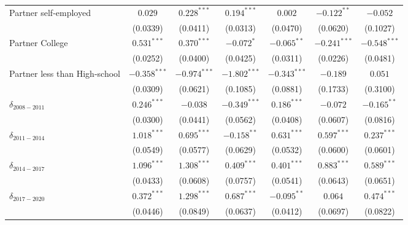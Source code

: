 \begin{tabular}{l|ccc|ccc}
Partner self-employed         &         $0.029$ &   $0.228^{***}$ &   $0.194^{***}$ &                $0.002$ &   $-0.122^{**}$ &        $-0.052$ \\
                              &        (0.0339) &        (0.0411) &        (0.0313) &               (0.0470) &        (0.0620) &        (0.1027) \\
Partner College               &   $0.531^{***}$ &   $0.370^{***}$ &      $-0.072^*$ &          $-0.065^{**}$ &  $-0.241^{***}$ &  $-0.548^{***}$ \\
                              &        (0.0252) &        (0.0400) &        (0.0425) &               (0.0311) &        (0.0226) &        (0.0481) \\
Partner less than High-school &  $-0.358^{***}$ &  $-0.974^{***}$ &  $-1.802^{***}$ &         $-0.343^{***}$ &        $-0.189$ &         $0.051$ \\
                              &        (0.0309) &        (0.0621) &        (0.1085) &               (0.0881) &        (0.1733) &        (0.3100) \\
$\delta_{2008-2011}$          &   $0.246^{***}$ &        $-0.038$ &  $-0.349^{***}$ &          $0.186^{***}$ &        $-0.072$ &   $-0.165^{**}$ \\
                              &        (0.0300) &        (0.0441) &        (0.0562) &               (0.0408) &        (0.0607) &        (0.0816) \\
$\delta_{2011-2014}$          &   $1.018^{***}$ &   $0.695^{***}$ &   $-0.158^{**}$ &          $0.631^{***}$ &   $0.597^{***}$ &   $0.237^{***}$ \\
                              &        (0.0549) &        (0.0577) &        (0.0629) &               (0.0532) &        (0.0600) &        (0.0601) \\
$\delta_{2014-2017}$          &   $1.096^{***}$ &   $1.308^{***}$ &   $0.409^{***}$ &          $0.401^{***}$ &   $0.883^{***}$ &   $0.589^{***}$ \\
                              &        (0.0433) &        (0.0608) &        (0.0757) &               (0.0541) &        (0.0643) &        (0.0651) \\
$\delta_{2017-2020}$          &   $0.372^{***}$ &   $1.298^{***}$ &   $0.687^{***}$ &          $-0.095^{**}$ &         $0.064$ &   $0.474^{***}$ \\
                              &        (0.0446) &        (0.0849) &        (0.0637) &               (0.0412) &        (0.0697) &        (0.0822) \\

\end{tabular}
